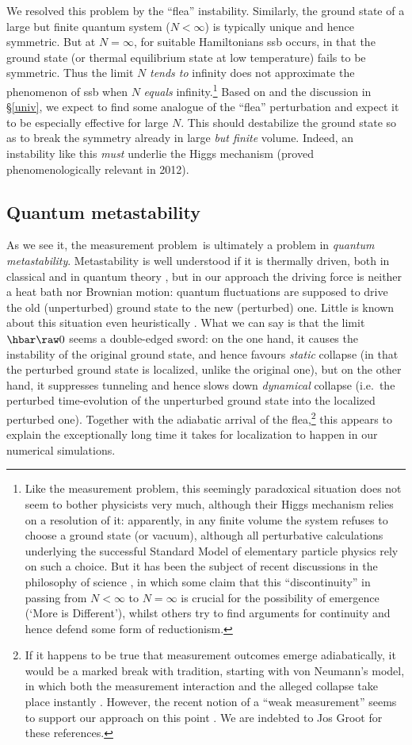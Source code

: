 \documentclass[12pt]{article}
\newcommand{\mmp}{measurement problem}
\begin{document}
 We resolved this problem by the ``flea'' instability. 
 Similarly, the ground state of a large but finite quantum system ($N<\infty$) is typically unique and hence symmetric. But at $N=\infty$,  for suitable Hamiltonians  {\sc ssb} occurs, in that the ground state (or thermal equilibrium state at low temperature) fails to be symmetric. Thus the limit
$N$ \emph{tends to} infinity does not approximate the phenomenon of {\sc ssb} when $N$ \emph{equals} infinity.\footnote{
Like the \mmp, this seemingly paradoxical situation does not seem to bother physicists very much, although their Higgs mechanism relies on a resolution of it: apparently, in any finite volume the system refuses to choose a ground state (or vacuum), although all perturbative calculations underlying the successful Standard Model of elementary particle physics rely on such a choice. 
 But it has been the subject of recent discussions in the philosophy of science \cite{Bat,Butt,LiuEmch,MC,Norton}, in which some claim that this ``discontinuity'' in passing from $N<\infty$ to $N=\infty$ is crucial for the possibility of emergence (`More is Different'), whilst others try to find arguments for continuity and hence defend some form of reductionism.}
 Based on \cite{KT} and the discussion in \S\ref{univ}, we expect to find some analogue of the ``flea'' perturbation and expect it to be especially effective for large $N$. This should destabilize the ground state so as to break the symmetry already in large \emph{but finite} volume. Indeed, an instability like this \emph{must} underlie the Higgs mechanism (proved phenomenologically relevant in 2012).
  \subsection{Quantum metastability}\label{secQM}
As we see it, the \mmp\ is ultimately a problem in \emph{quantum metastability}. 
 Metastability is well understood if it is thermally driven, both in classical and in quantum theory 
 \cite{HTB, OlVa05,Sewell0,Sewell1}, but in our approach the driving force is neither a heat bath nor Brownian motion: quantum fluctuations are supposed to drive the old (unperturbed) ground state to the new (perturbed) one. Little is known about this situation even heuristically
 \cite{Nieto,Shifman}.  What we can say is that the limit $\hbar\raw 0$ seems a double-edged sword: on the one hand, it causes the instability of the original  ground state, and hence favours \emph{static} collapse (in that the perturbed ground state is localized, unlike the original one), but on the other hand, it suppresses tunneling and hence slows down \emph{dynamical} collapse (i.e.\ the perturbed time-evolution of  the unperturbed ground state into the localized perturbed one). Together with the adiabatic arrival of the flea,\footnote{If it happens to be true that measurement outcomes emerge adiabatically, it would be a marked break with tradition, starting with von Neumann's model, in which both the measurement interaction and the alleged collapse take place instantly \cite{vN32}.  However, the recent notion of a ``weak measurement'' seems to support our approach on this point \cite{Koc,LW,Roz}. We are indebted to Jos Groot for these references. } 
this appears to explain the exceptionally long time it takes for localization to happen in our numerical simulations.   
\end{document}
